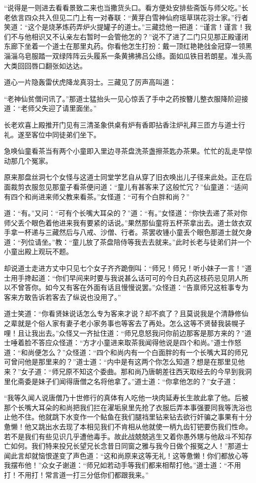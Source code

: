\documentclass[12pt,UTF8]{ctexbook}
\begin{document}
“说得是一则进去看看景致二来也当撒货头口。看方便处安排些斋饭与师父吃。”长老依言四众共入但见二门上有一对春联：“黄芽白雪神仙府瑶草琪花羽士家。”行者笑道：“这个是烧茅炼药弄炉火提罐子的道士。”三藏捻他一把道：“谨言！谨言！我们不与他相识又不认亲左右暂时一会管他怎的？”说不了进了二门只见那正殿谨闭东廊下坐着一个道士在那里丸药。你看他怎生打扮：戴一顶红艳艳戗金冠穿一领黑淄淄乌皂服踏一双绿阵阵云头履系一条黄拂拂吕公绦。面如瓜铁目若朗星。准头高大类回回唇口翻张如达达。

道心一片隐轰雷伏虎降龙真羽士。三藏见了厉声高叫道：

“老神仙贫僧问讯了。”那道士猛抬头一见心惊丢了手中之药按簪儿整衣服降阶迎接道：“老师父失迎了请里面坐。”

长老欢喜上殿推开门见有三清圣象供桌有炉有香即拈香注炉礼拜三匝方与道士行礼。遂至客位中同徒弟们坐下。

急唤仙童看茶当有两个小童即入里边寻茶盘洗茶盏擦茶匙办茶果。忙忙的乱走早惊动那几个冤家。

原来那盘丝洞七个女怪与这道士同堂学艺自从穿了旧衣唤出儿子径来此处。正在后面裁剪衣服忽见那童子看茶便问道：“童儿有甚客来了这般忙冗？”仙童道：“适间有四个和尚进来师父教来看茶。”女怪道：“可有个白胖和尚？”

道：“有。”又问：“可有个长嘴大耳朵的？”道：“有。”女怪道：“你快去递了茶对你师父丢个眼色着他进来我有要紧的话说。”果然那仙童将五杯茶拿出去。道士敛衣双手拿一杯递与三藏然后与八戒、沙僧、行者。茶罢收锺小童丢个眼色那道士就欠身道：“列位请坐。”教：“童儿放了茶盘陪侍等我去去就来。”此时长老与徒弟们并一个小童出殿上观玩不题。

却说道士走进方丈中只见七个女子齐齐跪倒叫：“师兄！师兄！听小妹子一言！”道士用手搀起道：“你们早间来时要与我说甚么话可可的今日丸药这枝药忌见阴人所以不曾答你。如今又有客在外面有话且慢慢说罢。”众怪道：“告禀师兄这桩事专为客来方敢告诉若客去了纵说也没用了。”

道士笑道：“你看贤妹说话怎么专为客来才说？却不疯了？且莫说我是个清静修仙之辈就是个俗人家有妻子老小家务事也等客去了再处。怎么这等不贤替我装幌子哩！且让我出去。”众怪又一齐扯住道：“师兄息怒我问你前边那客是那方来的？”道士唾着脸不答应众怪道：“方才小童进来取茶我闻得他说是四个和尚。”道士作怒道：“和尚便怎么？”众怪道：“四个和尚内有一个白面胖的有一个长嘴大耳的师兄可曾问他是那里来的？”道士道：“内中是有这两个你怎么知道？想是在那里见他来？”女子道：“师兄原不知这个委曲。那和尚乃唐朝差往西天取经去的今早到我洞里化斋委是妹子们闻得唐僧之名将他拿了。”道士道：“你拿他怎的？”女子道：

“我等久闻人说唐僧乃十世修行的真体有人吃他一块肉延寿长生故此拿了他。后被那个长嘴大耳朵的和尚把我们拦在濯垢泉里先抢了衣服后弄本事强要同我等洗浴也止他不住。他就跳下水变作一个鲇鱼在我们腿裆里钻来钻去欲行奸骗之事果有十分惫懒！他又跳出水去现了本相见我们不肯相从他就使一柄九齿钉钯要伤我们性命。若不是我们有些见识几乎遭他毒手。故此战兢兢逃生又着你愚外甥与他敌斗不知存亡如何。我们特来投兄长望兄长念昔日同窗之雅与我今日做个报冤之人！”那道士闻此言却就恼恨遂变了声色道：“这和尚原来这等无礼！这等惫懒！你们都放心等我摆布他！”众女子谢道：“师兄如若动手等我们都来相帮打他。”道士道：“不用打！不用打！常言道一打三分低你们都跟我来。”
\end{document}
